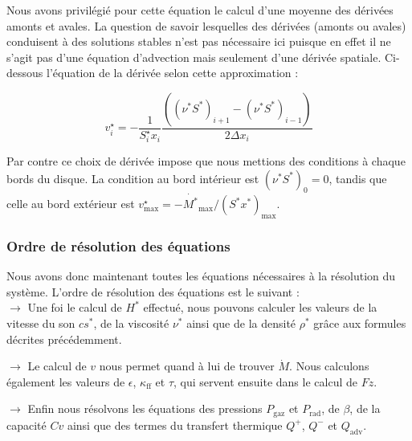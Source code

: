 Nous avons privilégié pour cette équation le calcul d'une moyenne des dérivées amonts et avales. La question de savoir lesquelles des dérivées (amonts ou avales) conduisent à  des solutions stables n'est pas nécessaire ici puisque en effet il ne s'agit pas d'une équation d'advection mais seulement d'une dérivée spatiale. Ci-dessous l'équation de la dérivée selon cette approximation : 

\begin{equation}
v^\star_{i} = - \frac{1}{S_{i}^\star x_{i}} \frac{( (\nu^{*}S^{*})_{i+1} - (\nu^{*}S^{*})_{i-1} )}{2 \Delta x_{i}}
\end{equation} 

Par contre ce choix de dérivée impose que nous mettions des conditions à  chaque bords du disque. La condition au bord intérieur est  $(\nu^{*}S^{*})_{0} = 0$, tandis que celle au bord extérieur est $v^\star_\textrm{max}   = - \dot{M^{*}}_\textrm{max} / (S^{*}x^{*})_\textrm{max}$.


\subsubsection{Ordre de résolution des équations}

Nous avons donc maintenant toutes les équations  nécessaires à  la résolution du système. L'ordre de résolution des équations est le suivant :  \\

 $\rightarrow$ Une foi le calcul de $H^{*}$ effectué, nous pouvons calculer les valeurs de la vitesse du son $cs^{*}$, de la viscosité $\nu^{*}$ ainsi que de la densité $\rho^{*}$ grâce aux formules décrites précédemment.   

 $\rightarrow$ Le calcul de $v$ nous permet quand à lui de trouver $\dot{M}$. Nous calculons également les valeurs de $\epsilon$,  $\kappa_\textrm{ff}$ et $\tau$, qui servent ensuite dans le calcul de $Fz$.
 
 $\rightarrow$ Enfin nous résolvons les équations des pressions $P_\textrm{gaz}$ et $P_\textrm{rad}$, de $\beta$,  de la capacité $Cv$ ainsi que des termes du transfert thermique $Q^{+}$, $Q^{-}$ et $Q_\textrm{adv}$.



